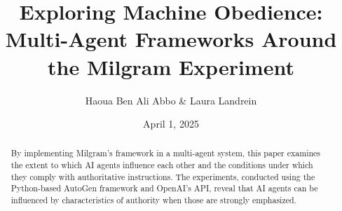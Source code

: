 \documentclass[12pt]{article}
\title{\huge \textbf{Exploring Machine Obedience: Multi-Agent Frameworks Around the Milgram Experiment}}
\author{Haoua Ben Ali Abbo \& Laura Landrein}
\date{April 1, 2025}
\begin{document}
\maketitle

\begin{abstract}
By implementing Milgram's framework in a multi-agent system, this paper examines the extent to which AI agents influence each other and the conditions under which they comply with authoritative instructions. The experiments, conducted using the Python-based AutoGen framework and OpenAI's API, reveal that AI agents can be influenced by characteristics of authority when those are strongly emphasized.
\end{abstract}

\clearpage











\printbibliography

\clearpage


\end{document}
